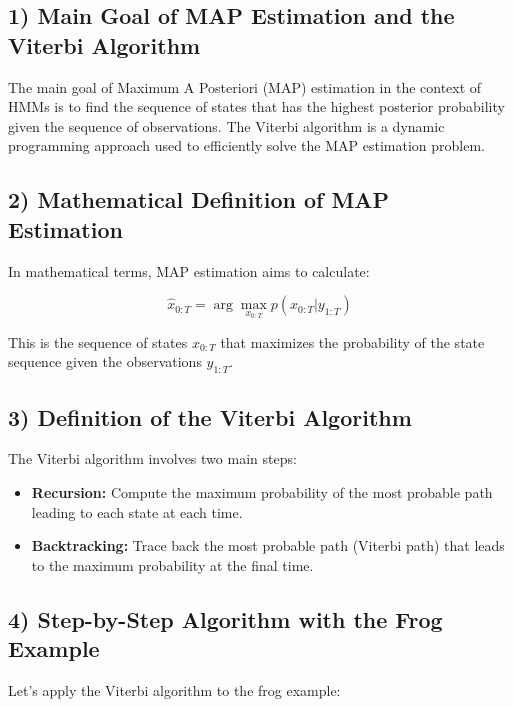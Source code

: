 \documentclass[10pt]{article}
\begin{document}
\subsection*{1) Main Goal of MAP Estimation and the Viterbi Algorithm}
The main goal of Maximum A Posteriori (MAP) estimation in the context of HMMs is to find the sequence of states that has the highest posterior probability given the sequence of observations. The Viterbi algorithm is a dynamic programming approach used to efficiently solve the MAP estimation problem.

\subsection*{2) Mathematical Definition of MAP Estimation}
In mathematical terms, MAP estimation aims to calculate:

\[ \hat{x}_{0:T} = \arg \max_{x_{0:T}} p(x_{0:T}|y_{1:T}) \]

This is the sequence of states \( x_{0:T} \) that maximizes the probability of the state sequence given the observations \( y_{1:T} \).

\subsection*{3) Definition of the Viterbi Algorithm}
The Viterbi algorithm involves two main steps:

\begin{itemize}
  \item \textbf{Recursion:} Compute the maximum probability of the most probable path leading to each state at each time.
  \item \textbf{Backtracking:} Trace back the most probable path (Viterbi path) that leads to the maximum probability at the final time.
\end{itemize}

\subsection*{4) Step-by-Step Algorithm with the Frog Example}
Let's apply the Viterbi algorithm to the frog example:
\end{document}
